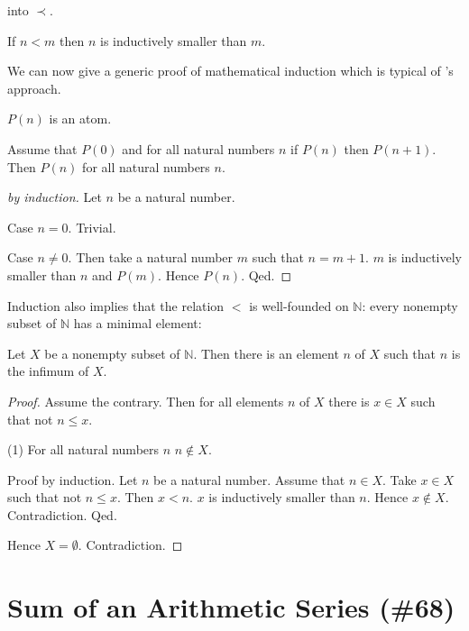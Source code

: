 \documentclass{article}
\begin{document}
into $\prec$.
%
\begin{forthel}
\begin{axiom}
If $n < m$ then $n$ is inductively smaller than $m$.
\end{axiom}
\end{forthel}
We can now give a generic proof of mathematical induction which
is typical of \Naproche's approach.
\begin{forthel}
\begin{signature}
$P(n)$ is an atom.
\end{signature}

\begin{theorem}
Assume that $P(0)$ and for all natural numbers
$n$ if $P(n)$ then  $P(n+1)$.
Then $P(n)$ for all natural numbers $n$.
\end{theorem}
\begin{proof}[by induction]
Let $n$ be a natural number.

Case $n = 0$. Trivial.

Case $n \neq 0$. Then take a natural number $m$ such that
$n = m + 1$. $m$ is inductively smaller than $n$ and $P(m)$. 
Hence $P(n)$.
Qed.
\end{proof}
\end{forthel}

Induction also implies that the relation $<$ is 
well-founded on $\mathbb{N}$: every nonempty subset
of $\mathbb{N}$ has a minimal element:

\begin{forthel}
\begin{theorem}
Let $X$ be a nonempty subset of $\mathbb{N}$.
Then there is an element $n$ of $X$ such that
$n$ is the infimum of $X$.
\end{theorem}
\begin{proof}
Assume the contrary. Then
for all elements $n$ of $X$ there
is $x \in X$ such that not $n \leq x$.

(1) For all natural numbers $n$ $n \notin X$.

Proof by induction.
Let $n$ be a natural number.
Assume that $n \in X$.
Take $x \in X$ such that not $n \leq x$.
Then $x < n$. $x$ is inductively smaller than $n$.
Hence $x \notin X$. Contradiction.
Qed.

Hence $X = \emptyset$. Contradiction.

\end{proof}
\end{forthel}


\section{Sum of an Arithmetic Series (\#68)}
\end{document}
